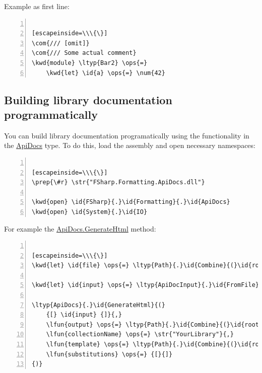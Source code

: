 \documentclass{article}
\newcommand{\id}[1]{\textcolor{black}{#1}}
\newcommand{\com}[1]{\textcolor{officegreen}{#1}}
\newcommand{\kwd}[1]{\textcolor{navy}{#1}}
\newcommand{\num}[1]{\textcolor{officegreen}{#1}}
\newcommand{\ops}[1]{\textcolor{purple}{#1}}
\newcommand{\prep}[1]{\textcolor{purple}{#1}}
\newcommand{\str}[1]{\textcolor{olive}{#1}}
\begin{document}
Example as first line:
\begin{lstlisting}[numbers=left]

[escapeinside=\\\{\}]
\com{/// [omit]}
\com{/// Some actual comment}
\kwd{module} \ltyp{Bar2} \ops{=}
    \kwd{let} \id{a} \ops{=} \num{42}

\end{lstlisting}

\subsection*{Building library documentation programmatically}



You can build library documentation programatically using the functionality
in the \href{https://fsprojects.github.io/FSharp.Formatting/reference/fsharp-formatting-apidocs-apidocs.html}{ApiDocs} type. To do this, load the assembly and open necessary namespaces:
\begin{lstlisting}[numbers=left]

[escapeinside=\\\{\}]
\prep{\#r} \str{"FSharp.Formatting.ApiDocs.dll"}

\kwd{open} \id{FSharp}{.}\id{Formatting}{.}\id{ApiDocs}
\kwd{open} \id{System}{.}\id{IO}

\end{lstlisting}



For example the \href{https://fsprojects.github.io/FSharp.Formatting/reference/fsharp-formatting-apidocs-apidocs.html\#GenerateHtml}{ApiDocs.GenerateHtml} method:
\begin{lstlisting}[numbers=left]

[escapeinside=\\\{\}]
\kwd{let} \id{file} \ops{=} \ltyp{Path}{.}\id{Combine}{(}\id{root}{,} \str{"bin/YourLibrary.dll"}{)}

\kwd{let} \id{input} \ops{=} \ltyp{ApiDocInput}{.}\id{FromFile}{(}\id{file}{)}

\ltyp{ApiDocs}{.}\id{GenerateHtml}{(}
    {[} \id{input} {]}{,}
    \lfun{output} \ops{=} \ltyp{Path}{.}\id{Combine}{(}\id{root}{,} \str{"output"}{)}{,}
    \lfun{collectionName} \ops{=} \str{"YourLibrary"}{,}
    \lfun{template} \ops{=} \ltyp{Path}{.}\id{Combine}{(}\id{root}{,} \str{"templates"}{,} \str{"template.html"}{)}{,}
    \lfun{substitutions} \ops{=} {[}{]}
{)}

\end{lstlisting}
\end{document}
